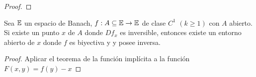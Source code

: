 \documentclass[12pt,a4paper]{book}
\begin{document}
\begin{teo}
\begin{proof}

\end{proof}
\end{teo}
\begin{teo}
Sea $\mathbb{E}$ un espacio de Banach, $f:A \subseteq \mathbb{E} \rightarrow \mathbb{E}$ de clase $C^1$ $(k \geq 1)$ con $A$ abierto. Si existe un punto $x$ de $A$ donde $Df_x$ es inversible, entonces existe un entorno abierto de $x$ donde $f$ es biyectiva y y posee inversa.
\begin{proof}
Aplicar el teorema de la función implícita a la función $F(x,y)= f(y) - x$
\end{proof}
\end{teo}
\end{document}

